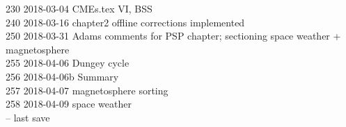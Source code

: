 \begin{titlepage}
\begin{footnotesize}
230	2018-03-04	CMEs.tex VI, BSS\\
240	2018-03-16	chapter2 offline corrections implemented\\
250	2018-03-31	Adams comments for PSP chapter; sectioning space weather + magnetosphere\\
255	2018-04-06	Dungey cycle\\
256	2018-04-06b	Summary\\
257	2018-04-07	magnetosphere sorting\\
258	2018-04-09	space weather\\
\vspace{\baselineskip}
\ISOToday{} \thistime{} -- last save
\end{footnotesize}


\end{titlepage}
